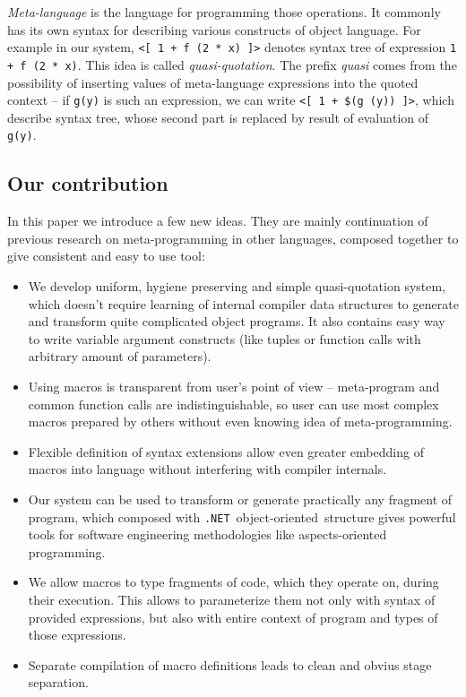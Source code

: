 \documentclass{llncs}
\newcommand{\net}[0]{{\tt .NET}}
\newcommand{\oo}[0]{object-oriented}
\begin{document}
\emph{Meta-language} is the language for programming those operations. It 
commonly has its own syntax for describing various constructs of object language.
For example in our system, \verb,<[ 1 + f (2 * x) ]>, denotes syntax 
tree of expression \verb,1 + f (2 * x),. This idea is called 
\emph{quasi-quotation}. The prefix \emph{quasi} comes from the possibility
of inserting values of meta-language expressions into the quoted context -- 
if \verb,g(y), is such an expression, we can write \verb.<[ 1 + $(g (y)) ]>., %
which describe syntax tree, whose second part is replaced by result of evaluation of
\verb,g(y),.

\subsection{Our contribution}
In this paper we introduce a few new ideas. They are mainly continuation of previous
research on meta-programming in other languages, composed together to give consistent
and easy to use tool:
\begin{itemize}
  \item We develop uniform, hygiene preserving and simple quasi-quotation system, 
    which doesn't require learning of internal compiler data structures to generate 
    and transform quite complicated object programs. It also contains easy way to 
    write variable argument constructs (like tuples or function calls with arbitrary 
    amount of parameters).
  \item Using macros is transparent from user's point of view -- meta-program and 
    common function calls are indistinguishable, so user can use most complex
    macros prepared by others without even knowing idea of meta-programming.
  \item Flexible definition of syntax extensions allow even greater embedding of 
    macros into language without interfering with compiler internals.
  \item Our system can be used to transform or generate practically any fragment
    of program, which composed with \net\ \oo\ structure gives powerful tools for
    software engineering methodologies like aspects-oriented programming.
  \item We allow macros to type fragments of code, which they operate on, during
    their execution. This allows to parameterize them not only with syntax of provided
    expressions, but also with entire context of program and types of those 
    expressions.
  \item Separate compilation of macro definitions leads to clean and obvius stage 
    separation.
\end{itemize}
\end{document}
